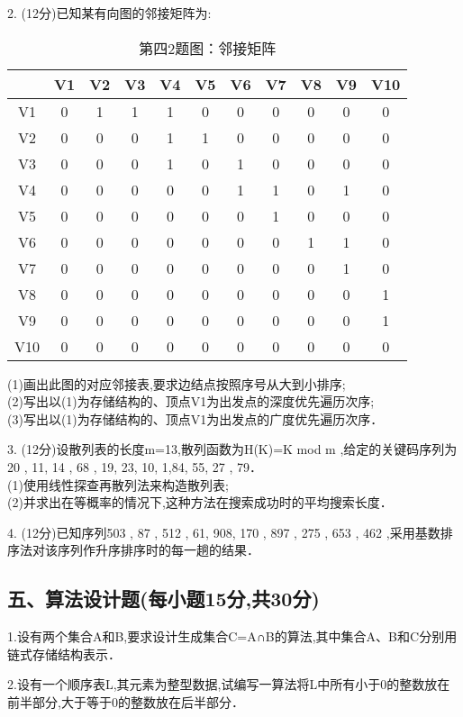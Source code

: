 2. (12分)已知某有向图的邻接矩阵为:
\begin{table}[ht]
\centering
\caption{第四2题图：邻接矩阵}\label{ZSDS13_tab1}
\begin{tabular}{|c|c|c|c|c|c|c|c|c|c|c|}
\hline
 & V1 & V2 & V3 & V4 & V5 & V6 & V7 & V8 & V9 & V10 \\
\hline
V1 & 0 & 1 & 1 & 1 & 0 & 0 & 0 & 0 & 0 & 0 \\
\hline
V2 & 0 & 0 & 0 & 1 & 1 & 0 & 0 & 0 & 0 & 0 \\
\hline
V3 & 0 & 0 & 0 & 1 & 0 & 1 & 0 & 0 & 0 & 0 \\
\hline
V4 & 0 & 0 & 0 & 0 & 0 & 1 & 1 & 0 & 1 & 0 \\
\hline
V5 & 0 & 0 & 0 & 0 & 0 & 0 & 1 & 0 & 0 & 0 \\
\hline
V6 & 0 & 0 & 0 & 0 & 0 & 0 & 0 & 1 & 1 & 0 \\
\hline
V7 & 0 & 0 & 0 & 0 & 0 & 0 & 0 & 0 & 1 & 0 \\
\hline
V8 & 0 & 0 & 0 & 0 & 0 & 0 & 0 & 0 & 0 & 1 \\
\hline
V9 & 0 & 0 & 0 & 0 & 0 & 0 & 0 & 0 & 0 & 1 \\
\hline
V10 & 0 & 0 & 0 & 0 & 0 & 0 & 0 & 0 & 0 & 0 \\
\hline
\end{tabular}
\end{table}
(1)画出此图的对应邻接表,要求边结点按照序号从大到小排序; \\
(2)写出以(1)为存储结构的、顶点V1为出发点的深度优先遍历次序; \\
(3)写出以(1)为存储结构的、顶点V1为出发点的广度优先遍历次序．

3. (12分)设散列表的长度m=13,散列函数为H(K)=K mod m ,给定的关键码序列为20 , 11, 14 , 68 , 19, 23, 10, 1,84, 55, 27 , 79． \\
(1)使用线性探查再散列法来构造散列表; \\
(2)并求出在等概率的情况下,这种方法在搜索成功时的平均搜索长度．

4. (12分)已知序列{503 , 87 , 512 , 61, 908, 170 , 897 , 275 , 653 , 462} ,采用基数排序法对该序列作升序排序时的每一趟的结果．

\subsection{五、算法设计题(每小题15分,共30分)}

1.设有两个集合A和B,要求设计生成集合C=A∩B的算法,其中集合A、B和C分别用链式存储结构表示．

2.设有一个顺序表L,其元素为整型数据,试编写一算法将L中所有小于0的整数放在前半部分,大于等于0的整数放在后半部分．